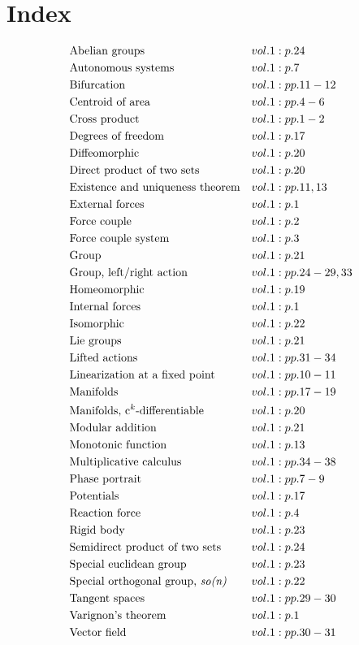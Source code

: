 \documentclass[a4paper]{article}
\begin{document}
 
\section*{Index} 
\begin{align*} 
&\text{Abelian groups}&& vol. 1: p. 24\\
&\text{Autonomous systems}&& vol. 1: p. 7\\
&\text{Bifurcation}&& vol. 1: pp. 11-12\\
&\text{Centroid of area}&& vol. 1: pp. 4-6\\
&\text{Cross product}&& vol. 1: pp. 1-2\\
&\text{Degrees of freedom}&& vol. 1: p. 17\\
&\text{Diffeomorphic}&& vol. 1: p. 20\\
&\text{Direct product of two sets}&& vol. 1: p. 20\\
&\text{Existence and uniqueness theorem}&& vol. 1: pp. 11, 13\\
&\text{External forces}&& vol. 1: p. 1\\
&\text{Force couple}&& vol. 1: p. 2\\
&\text{Force couple system}&& vol. 1: p. 3\\
&\text{Group}&& vol. 1: p. 21\\
&\text{Group, left/right action}&& vol. 1: pp. 24-29, 33\\
&\text{Homeomorphic}&& vol. 1: p. 19\\
&\text{Internal forces}&& vol. 1: p. 1\\
&\text{Isomorphic}&& vol. 1: p. 22\\
&\text{Lie groups}&& vol. 1: p. 21\\
&\text{Lifted actions}&& vol. 1: pp. 31-34\\
&\text{Linearization at a fixed point}&& vol. 1: pp. 10-11\\
&\text{Manifolds}&& vol. 1: pp. 17-19\\
&\text{Manifolds, c$^k$-differentiable}&& vol. 1: p. 20\\
&\text{Modular addition}&& vol. 1: p. 21\\
&\text{Monotonic function}&& vol. 1: p. 13\\
&\text{Multiplicative calculus}&& vol. 1: pp. 34-38\\
&\text{Phase portrait}&& vol. 1: pp. 7-9\\
&\text{Potentials}&& vol. 1: p. 17\\
&\text{Reaction force}&& vol. 1: p. 4\\
&\text{Rigid body}&& vol. 1: p. 23\\
&\text{Semidirect product of two sets}&& vol. 1: p. 24\\
&\text{Special euclidean group}&& vol. 1: p. 23\\
&\text{Special orthogonal group, \emph{so(n)}}&& vol. 1: p. 22\\
&\text{Tangent spaces}&& vol. 1: pp. 29-30\\
&\text{Varignon's theorem}&& vol. 1: p. 1\\
&\text{Vector field}&& vol. 1: pp. 30-31\\
\end{align*} 
\end{document}

